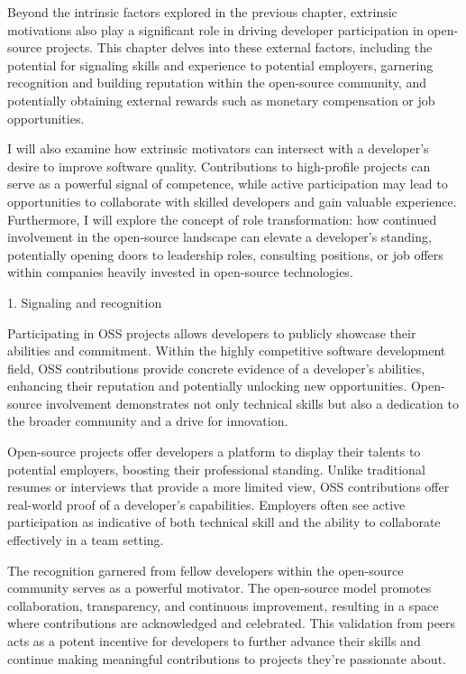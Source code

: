 Beyond the intrinsic factors explored in the previous chapter, extrinsic motivations also play a significant role in driving developer participation in open-source projects. This chapter delves into these external factors, including the potential for signaling skills and experience to potential employers, garnering recognition and building reputation within the open-source community, and potentially obtaining external rewards such as monetary compensation or job opportunities.

I will also examine how extrinsic motivators can intersect with a developer's  desire to improve software quality. Contributions to high-profile projects can serve as a powerful signal of competence, while active participation may lead to opportunities to collaborate with skilled developers and gain valuable experience.  Furthermore, I will explore the concept of role transformation: how continued involvement in the open-source landscape can elevate a developer's standing, potentially opening doors to leadership roles, consulting positions, or  job offers within companies heavily invested in open-source technologies.

1. Signaling and recognition

Participating in OSS projects allows developers to publicly showcase their abilities and commitment. Within the highly competitive software development field,  OSS contributions provide concrete evidence of a developer's abilities, enhancing their reputation and potentially unlocking new opportunities.  Open-source involvement demonstrates not only technical skills but also a dedication to the broader community and a drive for innovation.

Open-source projects offer developers a platform to display their talents to potential employers, boosting their professional standing. Unlike traditional resumes or interviews that provide a more limited view, OSS contributions offer real-world proof of a developer's capabilities. Employers often see active participation as indicative of both technical skill and the ability to collaborate effectively in a team setting.

The recognition garnered from fellow developers within the open-source community serves as a powerful motivator. The open-source model promotes collaboration, transparency, and continuous improvement, resulting in a space where contributions are acknowledged and celebrated. This validation from peers acts as a potent incentive for developers to further advance their skills and continue making meaningful contributions to projects they're passionate about.

